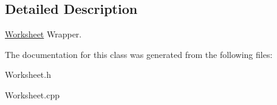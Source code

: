 \subsection{Detailed Description}
\hyperlink{class_excel_application_wrapper_1_1_worksheet}{Worksheet} Wrapper. 

The documentation for this class was generated from the following files\+:\begin{DoxyCompactItemize}
\item 
Worksheet.\+h\item 
Worksheet.\+cpp\end{DoxyCompactItemize}
